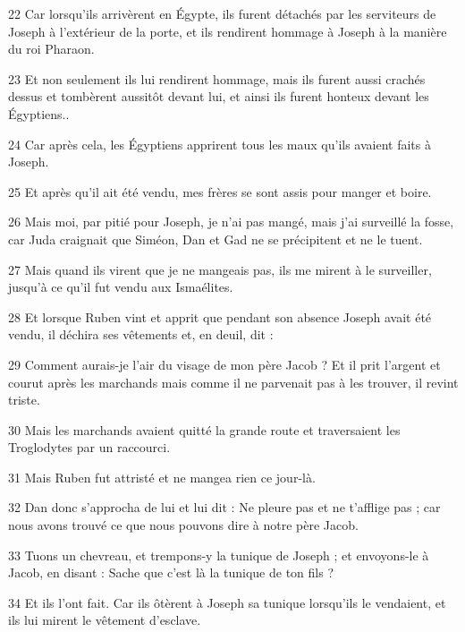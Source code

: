 \par 22 Car lorsqu'ils arrivèrent en Égypte, ils furent détachés par les serviteurs de Joseph à l'extérieur de la porte, et ils rendirent hommage à Joseph à la manière du roi Pharaon.

\par 23 Et non seulement ils lui rendirent hommage, mais ils furent aussi crachés dessus et tombèrent aussitôt devant lui, et ainsi ils furent honteux devant les Égyptiens..

\par 24 Car après cela, les Égyptiens apprirent tous les maux qu'ils avaient faits à Joseph.

\par 25 Et après qu'il ait été vendu, mes frères se sont assis pour manger et boire.

\par 26 Mais moi, par pitié pour Joseph, je n'ai pas mangé, mais j'ai surveillé la fosse, car Juda craignait que Siméon, Dan et Gad ne se précipitent et ne le tuent.

\par 27 Mais quand ils virent que je ne mangeais pas, ils me mirent à le surveiller, jusqu'à ce qu'il fut vendu aux Ismaélites.

\par 28 Et lorsque Ruben vint et apprit que pendant son absence Joseph avait été vendu, il déchira ses vêtements et, en deuil, dit :

\par 29 Comment aurais-je l'air du visage de mon père Jacob ? Et il prit l'argent et courut après les marchands mais comme il ne parvenait pas à les trouver, il revint triste.

\par 30 Mais les marchands avaient quitté la grande route et traversaient les Troglodytes par un raccourci.

\par 31 Mais Ruben fut attristé et ne mangea rien ce jour-là.

\par 32 Dan donc s'approcha de lui et lui dit : Ne pleure pas et ne t'afflige pas ; car nous avons trouvé ce que nous pouvons dire à notre père Jacob.

\par 33 Tuons un chevreau, et trempons-y la tunique de Joseph ; et envoyons-le à Jacob, en disant : Sache que c'est là la tunique de ton fils ?

\par 34 Et ils l'ont fait. Car ils ôtèrent à Joseph sa tunique lorsqu'ils le vendaient, et ils lui mirent le vêtement d'esclave.

